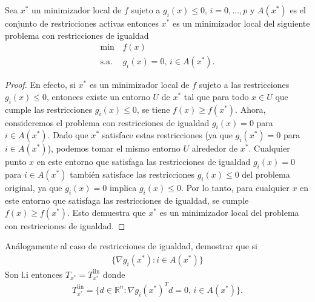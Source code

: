 \documentclass{article}
\newcommand{\R}{\mathbb{R}}
\newenvironment{theorem}[2][Ejercicio]{\begin{trivlist}
\item[\hskip \labelsep {\bfseries #1}\hskip \labelsep {\bfseries #2.}]}{\end{trivlist}}
\begin{document}
\begin{theorem}{2}
    Sea \( x^* \) un minimizador local de \( f \) sujeto a \( g_i(x) \leq 0, \, i = 0, \ldots, p \) y \( A(x^*) \) es el conjunto de restricciones
    activas entonces \( x^* \) es un minimizador local del siguiente problema con restricciones de igualdad \begin{align*}
        \min \,      & f(x)                         \\
        \text{s.a. } & g_i(x) = 0, \, i \in A(x^*).
    \end{align*}
\end{theorem}

\begin{proof}
    En efecto, si \( x^* \) es un minimizador local de \( f \) sujeto a las restricciones \( g_i(x) \leq 0 \), entonces existe un entorno \( U \) de \( x^* \)
    tal que para todo \( x \in U \) que cumple las restricciones \( g_i(x) \leq 0 \), se tiene \( f(x) \geq f(x^*) \).
    Ahora, consideremos el problema con restricciones de igualdad \( g_i(x) = 0 \) para \( i \in A(x^*) \). Dado que \( x^* \) satisface estas restricciones
    (ya que \( g_i(x^*) = 0 \) para \( i \in A(x^*) \)), podemos tomar el mismo entorno \( U \) alrededor de \( x
    ^* \).
    Cualquier punto \( x \) en este entorno que satisfaga las restricciones de igualdad \( g_i(x) = 0 \) para \( i \in A(x^*) \) también satisface las restricciones \( g_i(x) \leq 0 \) del problema original,
    ya que \( g_i(x) = 0 \) implica \( g_i(x) \leq 0 \).
    Por lo tanto, para cualquier \( x \) en este entorno que satisfaga las restricciones de igualdad, se cumple \( f(x) \geq f(x^*) \).
    Esto demuestra que \( x^* \) es un minimizador local del problema con restricciones de igualdad.
\end{proof}

\begin{theorem}{3}
    Análogamente al caso de restricciones de igualdad, demostrar que si \begin{align*}
        \{ \nabla g_i(x^*) : i \in A(x^*) \}
    \end{align*}
    Son l.i entonces \( T_{x^*} = T^{\text{lin}}_{x^*} \) donde \begin{align*}
        T^{\text{lin}}_{x^*} = \{ d \in \R^n : \nabla {g_i(x^*)}^T d = 0, \, i \in A(x^*) \}.
    \end{align*}
\end{theorem}
\end{document}
